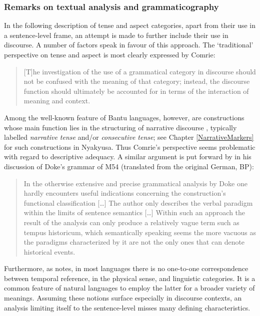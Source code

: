 \subsubsection{Remarks on textual analysis and grammaticography}
In the following description of tense and aspect categories, apart from their use in a sentence-level frame, an attempt is made to further include their use in discourse. A number of factors speak in favour of this approach. The \lq traditional' perspective on tense and aspect is most clearly expressed by Comrie:
\begin{quote}{[T]he investigation of the use of a grammatical category in discourse should not be confused with the meaning of that category; instead, the discourse function should ultimately be accounted for in terms of the interaction of meaning and context. \citep[29]{ComrieB1985}}\end{quote}

Among the well-known feature of Bantu languages, however, are constructions whose main function lies in the structuring of narrative discourse \citep[24]{NurseD2008}, typically labelled \textit{narrative tense} and/or \textit{consecutive tense}; see Chapter \ref{NarrativeMarkers} for such constructions in Nyakyusa. Thus Comrie's perspective seems problematic with regard to descriptive adequacy. A similar argument is put forward by \citet{GueldemannT1996} in his discussion of Doke's grammar of  M54 (translated from the original German, BP):
\begin{quote}{In the otherwise extensive and precise grammatical analysis by Doke one hardly encounters useful indications concerning the construction's functional classification […] The author only describes the verbal paradigm with\-in the limits of sentence semantics […] Within such an approach the result of the analysis can only produce a relatively vague term such as tempus historicum, which semantically speaking seems the more vacuous as the paradigms characterized by it are not the only ones that can denote historical events. \citep[208]{GueldemannT1996}}\end{quote}

Furthermore, as \citet[77--79]{LevinsonS1983} notes, in most languages there is no one-to-one correspondence between temporal reference, in the physical sense, and linguistic categories. It is a common feature of natural languages to employ the latter for a broader variety of meanings. Assuming these notions surface especially in discourse contexts, an analysis limiting itself to the sentence-level misses many defining characteristics.

